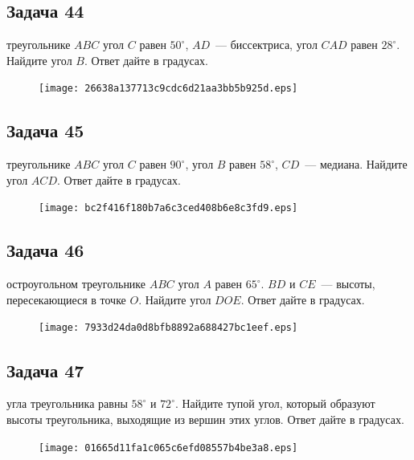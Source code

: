 \documentclass[a4paper,10pt]{article} %
\begin{document}
\begin{spacing}{1.0}
{\subsection*{Задача 44}
 треугольнике $ABC$ угол $C$ равен $50^\circ$, $AD$~--- биссектриса, угол $CAD$ равен $28^\circ$. Найдите угол $B$. Ответ дайте в градусах.

\vspace{1.5cm}

\begin{figure}{\texttt{[image: 26638a137713c9cdc6d21aa3bb5b925d.eps]}}\end{figure}
\subsection*{Задача 45}
 треугольнике $ABC$ угол $C$ равен $90^\circ$, угол $B$ равен $58^\circ$, $CD$~--- медиана. Найдите угол $ACD$. Ответ дайте в градусах.

\vspace{1.5cm}

\begin{figure}{\texttt{[image: bc2f416f180b7a6c3ced408b6e8c3fd9.eps]}}\end{figure}
\subsection*{Задача 46}
 остроугольном треугольнике $ABC$ угол $A$ равен $65^\circ$. $BD$ и $CE$~--- высоты, пересекающиеся в точке $O$. Найдите угол $DOE$. Ответ дайте в градусах.

\vspace{1.5cm}

\begin{figure}{\texttt{[image: 7933d24da0d8bfb8892a688427bc1eef.eps]}}\end{figure}
\subsection*{Задача 47}
 угла треугольника равны $58^\circ$ и $72^\circ$. Найдите тупой угол, который образуют высоты треугольника, выходящие из вершин этих углов. Ответ дайте в градусах.

\vspace{1.5cm}

\begin{figure}{\texttt{[image: 01665d11fa1c065c6efd08557b4be3a8.eps]}}\end{figure}
}
\end{spacing}
\end{document}
